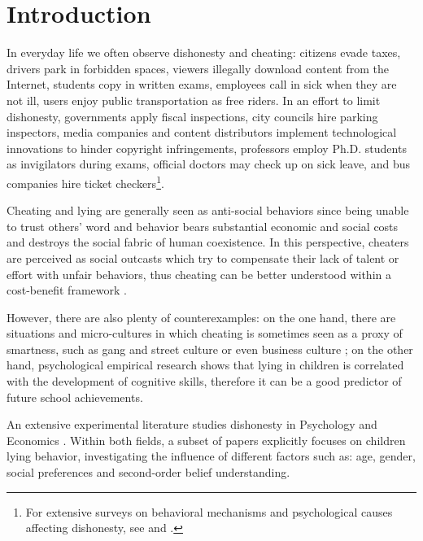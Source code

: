 \documentclass[authoryear, preprint, review, 12pt]{elsarticle}
\begin{document}
\section{Introduction}
In everyday life we often observe dishonesty and cheating: citizens evade taxes, drivers park in forbidden spaces, viewers illegally download content from the Internet, students copy in written exams, employees call in sick when they are not ill, users enjoy public transportation as free riders. In an effort to limit dishonesty, governments apply fiscal inspections, city councils hire parking inspectors, media companies and content distributors implement technological innovations to hinder copyright infringements, professors employ Ph.D. students as invigilators during exams, official doctors may check up on sick leave, and bus companies hire ticket checkers\footnote{For extensive surveys on behavioral mechanisms and psychological causes affecting dishonesty, see \cite{ma06} and \cite{jacobsen2018we}  .}. 
    
Cheating and lying are generally seen as anti-social behaviors since being unable to trust others' word and behavior bears substantial economic and social costs and destroys the social fabric of human coexistence. In this perspective, cheaters are perceived as social outcasts which try to compensate their lack of talent or effort with unfair behaviors, thus cheating can be better understood within a cost-benefit framework \citep{gtw13,g05}. 

However, there are also plenty of counterexamples: on the one hand, there are situations and micro-cultures in which cheating is sometimes seen as a proxy of smartness, such as gang and street culture \citep{b13} or even business culture \citep{cfm14}; on the other hand, psychological empirical research \citep{vasek1986lying,exl11,el13} shows that lying in children is correlated with the development of cognitive skills, therefore it can be a good predictor of future school achievements. 

An extensive experimental literature studies dishonesty in Psychology \citep{gl15,wsr03,ph99} and Economics \citep{kg17,ruffle2017clever,ariely2015true, ff13,maa08,g05}. Within both fields, a subset of papers \citep{cantin2016executive,maggian2016social,gl15,el13,ding2014elementary,bucciol2011temptation,bucciol2011luck,talwar2007lying} explicitly focuses on children lying behavior, investigating the influence of different factors such as: age, gender, social preferences and second-order belief understanding.
\end{document}
